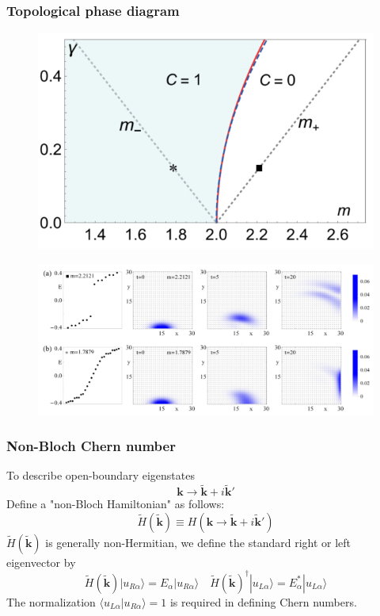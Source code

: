 \documentclass{beamer}
\begin{document}
\begin{frame}
\frametitle{Topological phase diagram}
\begin{figure}
\includegraphics[scale=0.3]{figure/2d-1.png}
\end{figure}
\begin{figure}
\includegraphics[scale=0.4]{figure/2d-2.png}
\end{figure}
\end{frame}
\begin{frame}
\frametitle{Non-Bloch Chern number}
To describe open-boundary eigenstates
$$\mathbf{k}\rightarrow \tilde{\mathbf{k}}+i\tilde{\mathbf{k}}'$$
Define a "non-Bloch Hamiltonian" as follows:
$$\tilde{H}(\tilde{\mathbf{k}})\equiv H(\mathbf{k}\rightarrow \tilde{\mathbf{k}}+i\tilde{\mathbf{k}}')$$
$\tilde{H}(\tilde{\mathbf{k}})$ is generally non-Hermitian, we define the standard right or left eigenvector by
\begin{equation}
\tilde{H}(\tilde{\mathbf{k}})|u_{R\alpha}\rangle=E_{\alpha}|u_{R\alpha}\rangle\quad \tilde{H}(\tilde{\mathbf{k}})^\dagger|u_{L\alpha}\rangle=E^*_\alpha|u_{L\alpha}\rangle
\end{equation}
The normalization $\langle u_{L\alpha}|u_{R\alpha}\rangle=1$ is required in defining Chern numbers.
\end{frame}
\end{document}
